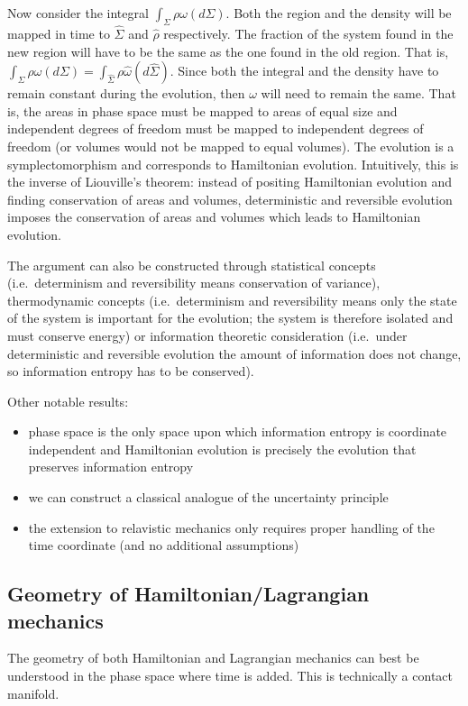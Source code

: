 \documentclass[11pt,letterpaper,fleqn]{memoir} %
\begin{document}
Now consider the integral $\int_{\Sigma} \rho \omega(d\Sigma)$. Both the region and the density will be mapped in time to $\hat{\Sigma}$ and $\hat{\rho}$ respectively. The fraction of the system found in the new region will have to be the same as the one found in the old region. That is, $\int_{\Sigma} \rho \omega(d\Sigma) = \int_{\hat{\Sigma}} \rho \hat{\omega}(d\hat{\Sigma})$. Since both the integral and the density have to remain constant during the evolution, then $\omega$ will need to remain the same. That is, the areas in phase space must be mapped to areas of equal size and independent degrees of freedom must be mapped to independent degrees of freedom (or volumes would not be mapped to equal volumes). The evolution is a symplectomorphism and corresponds to Hamiltonian evolution. Intuitively, this is the inverse of Liouville's theorem: instead of positing Hamiltonian evolution and finding conservation of areas and volumes, deterministic and reversible evolution imposes the conservation of areas and volumes which leads to Hamiltonian evolution.

The argument can also be constructed through statistical concepts (i.e.~determinism and reversibility means conservation of variance), thermodynamic concepts (i.e.~determinism and reversibility means only the state of the system is important for the evolution; the system is therefore isolated and must conserve energy) or information theoretic consideration (i.e.~under deterministic and reversible evolution the amount of information does not change, so information entropy has to be conserved).

Other notable results:
\begin{itemize}
	\item phase space is the only space upon which information entropy is coordinate independent and Hamiltonian evolution is precisely the evolution that preserves information entropy
	\item we can construct a classical analogue of the uncertainty principle
	\item the extension to relavistic mechanics only requires proper handling of the time coordinate (and no additional assumptions)
\end{itemize}

\subsection{Geometry of Hamiltonian/Lagrangian mechanics}

The geometry of both Hamiltonian and Lagrangian mechanics can best be understood in the phase space where time is added. This is technically a contact manifold.
\end{document}
